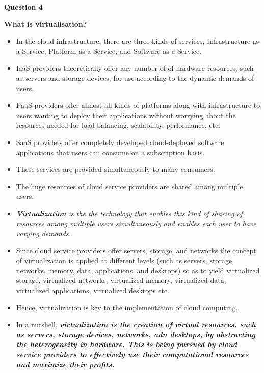 \documentclass[a4paper, 12pt]{article}
\begin{document}
\newpage
\begin{center}
\textbf{Question 4}\\
\end{center}
\textbf{What is virtualisation?}
\begin{itemize}
\item
In the cloud infrastructure, there are three kinds of services, Infrastructure as a Service, Platform as a Service, and Software as a Service.
\item
IaaS providers theoretically offer any number of of hardware resources, such as servers and storage devices, for use according to the dynamic demands of users.
\item
PaaS providers offer almost all kinds of platforms along with infrastructure to users wanting to deploy their applications without worrying about the resources needed for load balancing, scalability, performance, etc.
\item
SaaS providers offer completely developed cloud-deployed software applications that users can consume on a subscription basis.
\item
These services are provided simultaneously to many consumers.
\item
The huge resources of cloud service providers are shared among multiple users.
\item
\textit{\textbf{Virtualization} is the the technology that enables this kind of sharing of resources among multiple users simultaneously and enables each user to have varying demands.}
\item
Since cloud service providers offer servers, storage, and networks the concept of virtualization is applied at different levels (such as servers, storage, networks, memory, data, applications, and desktops) so as to yield virtualized storage, virtualized networks, virtualized memory, virtualized data, virtualized applications, virtualized desktops etc.
\item
Hence, virtualization is key to the implementation of cloud computing.
\item
In a nutshell, \textbf{\textit{virtualization is the creation of virtual resources, such as servers, storage devices, networks, adn desktops, by abstracting the heterogeneity in hardware. This is being pursued by cloud service providers to effectively use their computational resources and maximize their profits.}}
\end{itemize}
\end{document}

